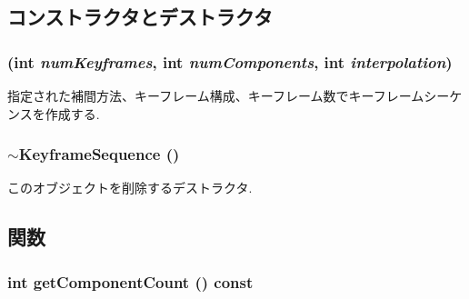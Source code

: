 \subsection{コンストラクタとデストラクタ}
\hypertarget{classm3g_1_1KeyframeSequence_0c07c479375c11ff94cff02c1267f0d0}{
\subsubsection[{KeyframeSequence}]{ (int {\em numKeyframes}, \/  int {\em numComponents}, \/  int {\em interpolation})}}
\label{classm3g_1_1KeyframeSequence_0c07c479375c11ff94cff02c1267f0d0}


指定された補間方法、キーフレーム構成、キーフレーム数でキーフレームシーケンスを作成する. \hypertarget{classm3g_1_1KeyframeSequence_464f5929e3302c788ca626c11ca8d656}{
\subsubsection[{$\sim$KeyframeSequence}]{\setlength{\rightskip}{0pt plus 5cm}$\sim${\bf KeyframeSequence} ()}}
\label{classm3g_1_1KeyframeSequence_464f5929e3302c788ca626c11ca8d656}


このオブジェクトを削除するデストラクタ. 

\subsection{関数}
\hypertarget{classm3g_1_1KeyframeSequence_7016f51d2788e78fdd736efd040f5e5e}{
\subsubsection[{getComponentCount}]{\setlength{\rightskip}{0pt plus 5cm}int getComponentCount () const}}
\label{classm3g_1_1KeyframeSequence_7016f51d2788e78fdd736efd040f5e5e}


